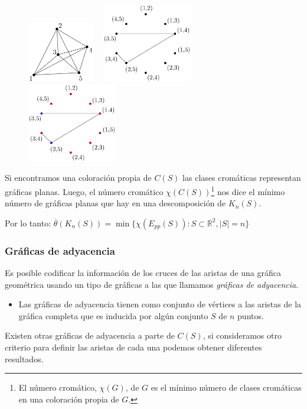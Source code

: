 \begin{frame}
\begin{figure}
	\centering
	\includegraphics[width=0.26\textwidth]{images/K5}%
	~\vrule
	\includegraphics[width=0.35\textwidth]{images/EppK5}
	~\vrule
	\includegraphics[width=0.35\textwidth]{images/EppK5_colored}
\end{figure}
Si encontramos una coloración propia de $C(S)$ las clases cromáticas representan gráficas planas. Luego, el número cromático $\chi(C(S))$\let\thefootnote\relax\footnote{El número cromático, $\chi(G)$, de $G$ es el mínimo número de clases cromáticas en una coloración propia de $G$.} nos dice el mínimo número de gráficas planas que hay en una descomposición de $K_n(S)$.

Por lo tanto: $\overline{\theta}(K_n(S)) = \min\{\chi(E_{pp}(S)) : S \subset \mathbb{R}^2, |S| = n\}$
\end{frame}

\begin{frame}\frametitle{Gráficas de adyacencia}
Es posible codificar la información de los cruces de las aristas de una gráfica geométrica usando un tipo de gráficas a las que llamamos \emph{gráficas de adyacencia}.

\begin{itemize}
	\item Las gráficas de adyacencia tienen como conjunto de vértices a las aristas de la gráfica completa que es inducida por algún conjunto $S$ de $n$ puntos.
\end{itemize}

	Existen otras gráficas de adyacencia a parte de $C(S)$, si consideramos otro criterio para definir las aristas de cada una podemos obtener diferentes resultados.
\end{frame}

